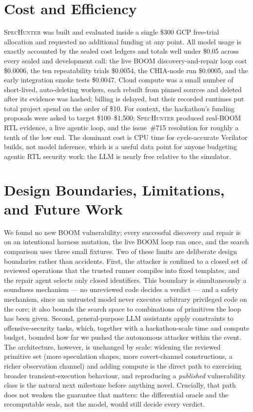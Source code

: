\documentclass[conference,10pt]{IEEEtran}
\newcommand{\sh}{\textsc{SpecHunter}}
\begin{document}
\section{Cost and Efficiency}\label{sec:cost}
\sh{} was built and evaluated inside a single \$300 GCP free-trial allocation and
requested no additional funding at any point. All model usage is exactly accounted
by the sealed cost ledgers and totals well under \$0.05 across every sealed and
development call: the live BOOM discovery-and-repair loop cost \$0.0006, the ten
repeatability trials \$0.0054, the CHIA-node run \$0.0005, and the early
integration smoke tests \$0.0047. Cloud compute was a small number of
short-lived, auto-deleting workers, each rebuilt from pinned sources and deleted
after its evidence was hashed; billing is delayed, but their recorded runtimes put
total project spend on the order of \$10. For context, the hackathon's funding
proposals were asked to target \$100--\$1{,}500; \sh{} produced real-BOOM RTL
evidence, a live agentic loop, and the issue~\#715 resolution for roughly a tenth
of the low end. The dominant cost is CPU time for cycle-accurate Verilator builds,
not model inference, which is a useful data point for anyone budgeting agentic RTL
security work: the LLM is nearly free relative to the simulator.

\section{Design Boundaries, Limitations, and Future Work}\label{sec:limits}
We found no new BOOM vulnerability; every successful discovery and repair is on an
intentional harness mutation, the live BOOM loop ran once, and the search
comparison uses three small fixtures. Two of these limits are deliberate design
boundaries rather than accidents. First, the attacker is confined to a closed set
of reviewed operations that the trusted runner compiles into fixed templates, and
the repair agent selects only closed identifiers. This boundary is simultaneously
a soundness mechanism --- no unreviewed code decides a verdict --- and a safety
mechanism, since an untrusted model never executes arbitrary privileged code on
the core; it also bounds the search space to combinations of primitives the loop
has been given. Second, general-purpose LLM assistants apply constraints to
offensive-security tasks, which, together with a hackathon-scale time and compute
budget, bounded how far we pushed the autonomous attacker within the event. The
architecture, however, is unchanged by scale: widening the reviewed primitive set
(more speculation shapes, more covert-channel constructions, a richer observation
channel) and adding compute is the direct path to exercising broader
transient-execution behaviour, and reproducing a \emph{published} vulnerability
class is the natural next milestone before anything novel. Crucially, that path
does not weaken the guarantee that matters: the differential oracle and the
recomputable seals, not the model, would still decide every verdict.
\end{document}
